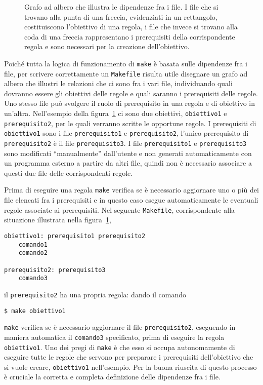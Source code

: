 \begin{figure}
  \centering
  \caption{Grafo ad albero che illustra le dipendenze fra i file.  I file che si
    trovano alla punta di una freccia, evidenziati in un rettangolo,
    costituiscono l'obiettivo di una regola, i file che invece si trovano alla
    coda di una freccia rappresentano i prerequisiti della corrispondente
    regola e sono necessari per la creazione dell'obiettivo.}
  \label{fig:grafo-albero1}
\end{figure}
Poiché tutta la logica di funzionamento di \texttt{make} è basata sulle
dipendenze fra i file, per scrivere correttamente un \texttt{Makefile} risulta
utile disegnare un grafo ad albero che illustri le relazioni che ci sono fra i
vari file, individuando quali dovranno essere gli obiettivi delle regole e quali
saranno i prerequisiti delle regole.  Uno stesso file può svolgere il ruolo di
prerequisito in una regola e di obiettivo in un'altra.  Nell'esempio della
figura~\ref{fig:grafo-albero1} ci sono due obiettivi, \texttt{obiettivo1} e
\texttt{prerequisito2}, per le quali verranno scritte le opportune regole.  I
prerequisiti di \texttt{obiettivo1} sono i file \texttt{prerequisito1} e
\texttt{prerequisito2}, l'unico prerequisito di \texttt{prerequisito2} è il file
\texttt{prerequisito3}.  I file \texttt{prerequisito1} e \texttt{prerequisito3}
sono modificati ``manualmente'' dall'utente e non generati automaticamente con
un programma esterno a partire da altri file, quindi non è necessario associare
a questi due file delle corrispondenti regole.

Prima di eseguire una regola \texttt{make} verifica se è necessario aggiornare
uno o più dei file elencati fra i prerequisiti e in questo caso esegue
automaticamente le eventuali regole associate ai prerequisiti.  Nel seguente
\texttt{Makefile}, corrispondente alla situazione illustrata nella
figura~\ref{fig:grafo-albero1},
\begin{lstlisting}
obiettivo1: prerequisito1 prerequisito2
	comando1
	comando2

prerequisito2: prerequisito3
	comando3
\end{lstlisting}
il \texttt{prerequisito2} ha una propria regola: dando il comando
\begin{verbatim}
$ make obiettivo1
\end{verbatim}
\texttt{make} verifica se è necessario aggiornare il file
\texttt{prerequisito2}, eseguendo in maniera automatica il \texttt{comando3}
specificato, prima di eseguire la regola \texttt{obiettivo1}.  Uno dei pregi di
\texttt{make} è che esso si occupa autonomamente di eseguire tutte le regole che
servono per preparare i prerequisiti dell'obiettivo che si vuole creare,
\texttt{obiettivo1} nell'esempio.  Per la buona riuscita di questo processo è
cruciale la corretta e completa definizione delle dipendenze fra i file.


